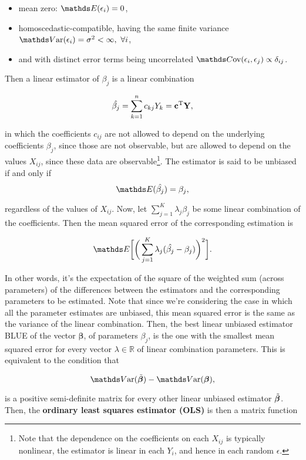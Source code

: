 \documentclass{homework}
\begin{document}
\begin{itemize}
    \item mean zero: $\E({\epsilon}_i) = 0$, 
    \item homoscedastic-compatible, having the same finite variance $\var({\epsilon}_i) = \sigma^2 < \infty, \blank \forall i$,
    \item and with distinct error terms being uncorrelated $\cov({\epsilon}_i, {\epsilon}_j) \propto \delta_{ij}$.
\end{itemize}

Then a linear estimator of $\beta_j$ is a linear combination 

$$
\hat{\beta_j} = \sum_{k = 1}^{n} c_{kj} {Y}_k = {\bf c}^{\textnormal{T}} {\bf Y},
$$

in which the coefficients $c_{ij}$ are not allowed to depend on the underlying coefficients $\beta_j$, since those are not observable, but are allowed to depend on the values $X_{ij}$, since these data are observable\footnote{Note that the dependence on the coefficients on each $X_{ij}$ is typically nonlinear, the estimator is linear in each $Y_i$, and hence in each random $\epsilon$.}. The estimator is said to be unbiased if and only if 
$$
\E(\hat{\beta_j}) = {\beta_j},
$$

regardless of the values of ${X}_{ij}$. Now, let $\sum_{j=1}^{K} \lambda_{j} \beta_{j}$ be some linear combination of the coefficients. Then the mean squared error of the corresponding estimation is 

$$
\E\bigg[\bigg(\sum_{j=1}^{K} \lambda_j (\hat{\beta_j} - {\beta_j})\bigg)^2\bigg].
$$

In other words, it's the expectation of the square of the weighted sum (across parameters) of the differences between the estimators and the corresponding parameters to be estimated. Note that since we're considering the case in which all the parameter estimates are unbiased, this mean squared error is the same as the variance of the linear combination. Then, the best linear unbiased estimator BLUE of the vector ${\bm \beta}$, of parameters $\beta_j$, is the one with the smallest mean squared error for every vector $\lambda \in \mathds{R}$ of linear combination parameters. This is equivalent to the condition that

$$
\var(\Tilde{{\bm \beta}}) - \var({{\bm \beta}}),
$$

is a positive semi-definite matrix for every other linear unbiased estimator $\Tilde{{\bm \beta}}$. Then, the \textbf{ordinary least squares estimator (OLS)} is then a matrix function 
\end{document}
